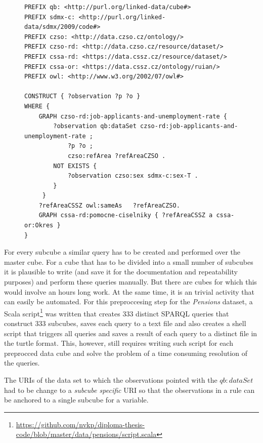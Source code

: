 \begin{figure}[h]
\begin{lstlisting}[language = SPARQL, caption={SPARQL query to create a subcube}, label={sparqlcutexample},captionpos=b escapeinside={(*@}{@*)}]
PREFIX qb: <http://purl.org/linked-data/cube#>
PREFIX sdmx-c: <http://purl.org/linked-data/sdmx/2009/code#>
PREFIX czso: <http://data.czso.cz/ontology/>
PREFIX czso-rd: <http://data.czso.cz/resource/dataset/>
PREFIX cssa-rd: <https://data.cssz.cz/resource/dataset/>
PREFIX cssa-or: <https://data.cssz.cz/ontology/ruian/>
PREFIX owl: <http://www.w3.org/2002/07/owl#>
    
CONSTRUCT { ?observation ?p ?o } 
WHERE { 
    GRAPH czso-rd:job-applicants-and-unemployment-rate {
        ?observation qb:dataSet czso-rd:job-applicants-and-unemployment-rate ;
            ?p ?o ;
            czso:refArea ?refAreaCZSO .
        NOT EXISTS {
            ?observation czso:sex sdmx-c:sex-T .
        }             
     }
    ?refAreaCSSZ owl:sameAs   ?refAreaCZSO.
    GRAPH cssa-rd:pomocne-ciselniky { ?refAreaCSSZ a cssa-or:Okres }
}
\end{lstlisting}
\end{figure}

For every subcube a similar query has to be created and performed over the master cube. For a cube that has to be divided into a small number of subcubes it is plausible to write (and save it for the documentation and repeatability purposes) and perform these queries manually. But there are cubes for which this would involve an hours long work. At the same time, it is an trivial activity that can easily be automated. For this preproccesing step for the \textit{Pensions} dataset, a Scala script\footnote{\href{https://github.com/nvkp/diploma-thesis-code/blob/master/data/pensions/script.scala}{https://github.com/nvkp/diploma-thesis-code/blob/master/data/pensions/script.scala}} was written that creates 333 distinct SPARQL queries that construct 333 subcubes, saves each query to a text file and also creates a shell script that triggers all queries and saves a result of each query to a distinct file in the turtle format. This, however, still requires writing such script for each preprocced data cube and solve the problem of a time consuming resolution of the queries.

The URIs of the data set to which the observations pointed with the $qb:dataSet$ had to be change to a \textit{subcube specific} URI so that the observations in a rule can be anchored to a single subcube for a variable.


